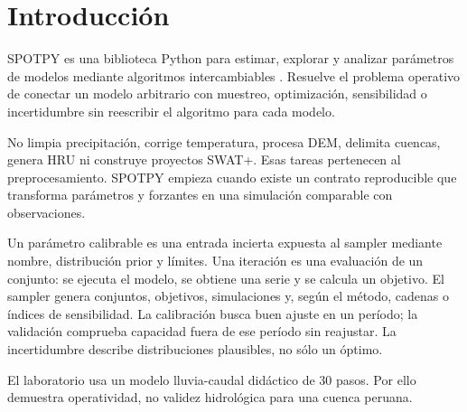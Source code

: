 \chapter{Introducción}
SPOTPY es una biblioteca Python para estimar, explorar y analizar parámetros de modelos mediante algoritmos intercambiables \citep{houska2015spotpy}. Resuelve el problema operativo de conectar un modelo arbitrario con muestreo, optimización, sensibilidad o incertidumbre sin reescribir el algoritmo para cada modelo.

No limpia precipitación, corrige temperatura, procesa DEM, delimita cuencas, genera HRU ni construye proyectos SWAT+. Esas tareas pertenecen al preprocesamiento. SPOTPY empieza cuando existe un contrato reproducible que transforma parámetros y forzantes en una simulación comparable con observaciones.

Un parámetro calibrable es una entrada incierta expuesta al sampler mediante nombre, distribución prior y límites. Una iteración es una evaluación de un conjunto: se ejecuta el modelo, se obtiene una serie y se calcula un objetivo. El sampler genera conjuntos, objetivos, simulaciones y, según el método, cadenas o índices de sensibilidad. La calibración busca buen ajuste en un período; la validación comprueba capacidad fuera de ese período sin reajustar. La incertidumbre describe distribuciones plausibles, no sólo un óptimo.

El laboratorio usa un modelo lluvia-caudal didáctico de 30 pasos. Por ello demuestra operatividad, no validez hidrológica para una cuenca peruana.

